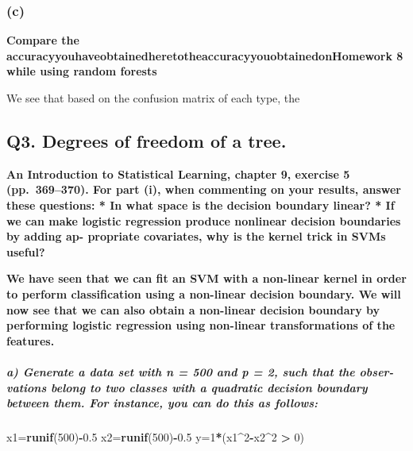 \documentclass[]{article}
\newenvironment{Shaded}{\begin{snugshade}}{\end{snugshade}}
\newcommand{\KeywordTok}[1]{\textcolor[rgb]{0.13,0.29,0.53}{\textbf{#1}}}
\newcommand{\DecValTok}[1]{\textcolor[rgb]{0.00,0.00,0.81}{#1}}
\newcommand{\FloatTok}[1]{\textcolor[rgb]{0.00,0.00,0.81}{#1}}
\newcommand{\StringTok}[1]{\textcolor[rgb]{0.31,0.60,0.02}{#1}}
\newcommand{\OperatorTok}[1]{\textcolor[rgb]{0.81,0.36,0.00}{\textbf{#1}}}
\newcommand{\NormalTok}[1]{#1}
\let\oldsubparagraph\subparagraph
\renewcommand{\subparagraph}[1]{\oldsubparagraph{#1}\mbox{}}
\begin{document}
\subsubsection{(c)}\label{c}

\textbf{Compare the
accuracyyouhaveobtainedheretotheaccuracyyouobtainedonHomework 8 while
using random forests}

We see that based on the confusion matrix of each type, the

\subsection{Q3. Degrees of freedom of a
tree.}\label{q3.-degrees-of-freedom-of-a-tree.}

\textbf{An Introduction to Statistical Learning, chapter 9, exercise 5
(pp.~369--370). For part (i), when commenting on your results, answer
these questions: * In what space is the decision boundary linear? * If
we can make logistic regression produce nonlinear decision boundaries by
adding ap- propriate covariates, why is the kernel trick in SVMs
useful?}

\textbf{We have seen that we can fit an SVM with a non-linear kernel in
order to perform classification using a non-linear decision boundary. We
will now see that we can also obtain a non-linear decision boundary by
performing logistic regression using non-linear transformations of the
features.}

\subparagraph{a) Generate a data set with n = 500 and p = 2, such that
the obser- vations belong to two classes with a quadratic decision
boundary between them. For instance, you can do this as
follows:}\label{a-generate-a-data-set-with-n-500-and-p-2-such-that-the-obser--vations-belong-to-two-classes-with-a-quadratic-decision-boundary-between-them.-for-instance-you-can-do-this-as-follows}

\begin{Shaded}
\begin{Highlighting}[]
\NormalTok{x1=}\KeywordTok{runif}\NormalTok{(}\DecValTok{500}\NormalTok{)}\OperatorTok{-}\FloatTok{0.5}
\NormalTok{x2=}\KeywordTok{runif}\NormalTok{(}\DecValTok{500}\NormalTok{)}\OperatorTok{-}\FloatTok{0.5}
\NormalTok{y=}\DecValTok{1}\OperatorTok{*}\NormalTok{(x1}\OperatorTok{^}\DecValTok{2}\OperatorTok{-}\NormalTok{x2}\OperatorTok{^}\DecValTok{2} \OperatorTok{>}\StringTok{ }\DecValTok{0}\NormalTok{)}
\end{Highlighting}
\end{Shaded}
\end{document}
